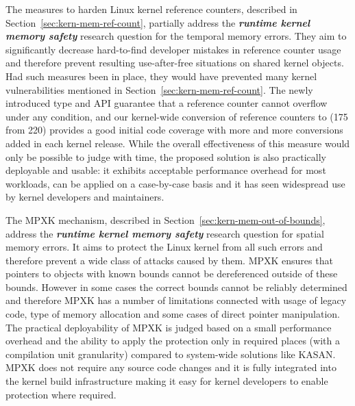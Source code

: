 The measures to harden Linux kernel reference counters, described in Section~\ref{sec:kern-mem-ref-count}, partially address the \textbf{\textit{runtime kernel memory safety}} research question for the temporal memory errors. They aim to significantly decrease hard-to-find developer mistakes in reference counter usage and therefore prevent resulting use-after-free situations on shared kernel objects. Had such measures been in place, they would have prevented many kernel vulnerabilities mentioned in Section~\ref{sec:kern-mem-ref-count}. The newly introduced  type and API guarantee that a reference counter cannot overflow under any condition, and our kernel-wide conversion of reference counters to  (175 from 220) provides a good initial code coverage with more and more conversions added in each kernel release. While the overall effectiveness of this measure would only be possible to judge with time, the proposed solution is also practically deployable and usable: it exhibits acceptable performance overhead for most workloads, can be applied on a case-by-case basis and it has seen widespread use by kernel developers and maintainers. 

The MPXK mechanism, described in Section~\ref{sec:kern-mem-out-of-bounds}, address the \textbf{\textit{runtime kernel memory safety}} research question for spatial memory errors. It aims to protect the Linux kernel from all such errors and therefore prevent a wide class of attacks caused by them. MPXK ensures that pointers to objects with known bounds cannot be dereferenced outside of these bounds. However in some cases the correct bounds cannot be reliably determined and therefore MPXK has a number of limitations connected with usage of legacy code, type of memory allocation and some cases of direct pointer manipulation. The practical deployability of MPXK is judged based on a small performance overhead and the ability to apply the protection only in required places (with a compilation unit granularity) compared to system-wide solutions like KASAN. MPXK does not require any source code changes and it is fully integrated into the kernel build infrastructure making it easy for kernel developers to enable protection where required.  